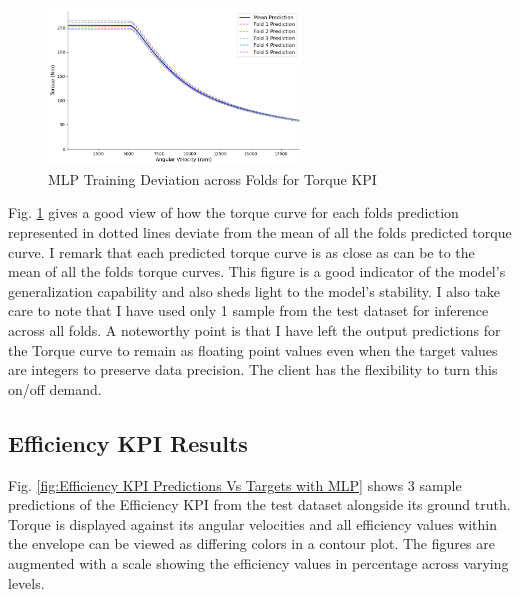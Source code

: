 \documentclass{report} %
\begin{document}
\begin{figure}[H]
    \centering
    \includegraphics[width=0.6\textwidth]{./ReportImages/folds_dev_y1.png} 
    \caption{MLP Training Deviation across Folds for Torque \ac{KPI}} 
    \label{fig:MLP Training Deviation across Folds for Torque KPI}
\end{figure}

Fig. \ref{fig:MLP Training Deviation across Folds for Torque KPI} gives a good view of how the torque curve for each folds prediction represented in dotted lines deviate 
from the mean of all the folds predicted torque curve. I remark that each predicted torque curve is as close as can be to the mean of all the folds torque curves.
This figure is a good indicator of the model's generalization capability and also sheds light to the model's stability.
I also take care to note that I have used only 1 sample from the test dataset for inference across all folds.
A noteworthy point is that I have left the output predictions for the Torque curve to remain as floating point values even when the target values are integers 
to preserve data precision. The client has the flexibility to turn this on/off demand.

\subsection{Efficiency KPI Results}\label{subsec:Efficiency KPI Results with MLP Efficiency KPI Regularization}
Fig. \ref{fig:Efficiency KPI Predictions Vs Targets with MLP} shows 3 sample predictions of the Efficiency \ac{KPI} from the test dataset alongside its ground truth.
Torque is displayed against its angular velocities and all efficiency values within the envelope can be viewed as differing colors in a contour plot. 
The figures are augmented with a scale showing the efficiency values in percentage across varying levels.
\end{document}
